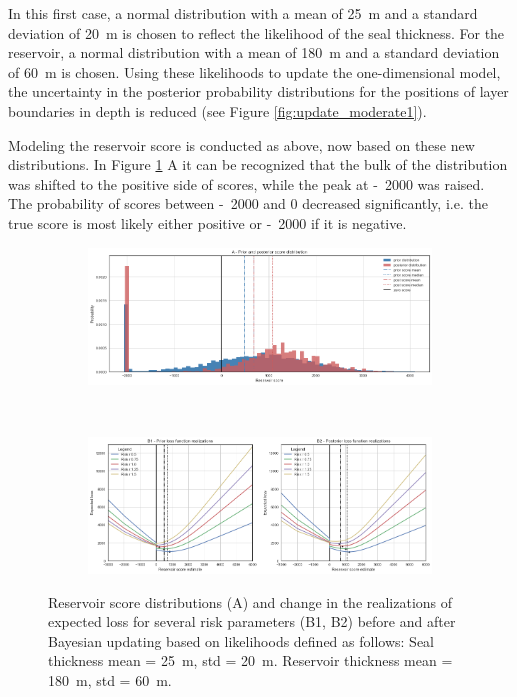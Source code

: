 				In this first case, a normal distribution with a mean of 25~m and a standard deviation of 20~m is chosen to reflect the likelihood of the seal thickness. For the reservoir, a normal distribution with a mean of 180~m and a standard deviation of 60~m is chosen. Using these likelihoods to update the one-dimensional model, the uncertainty in the posterior probability distributions for the positions of layer boundaries in depth is reduced (see Figure \ref{fig:update_moderate1}).
					
				Modeling the reservoir score is conducted as above, now based on these new distributions. In Figure \ref{fig:update_moderate2_3} A it can be recognized that the bulk of the distribution was shifted to the positive side of scores, while the peak at -~2000 was raised. The probability of scores between -~2000 and 0 decreased significantly, i.e. the true score is most likely either positive or -~2000 if it is negative.	
				
				\begin{figure}[h]
					\begin{subfigure}{1\textwidth}
						\centering
						\includegraphics[width=1\linewidth]{Figures/update_moderate2.png}
					\end{subfigure}%
					\\
					\begin{subfigure}{1\textwidth}
						\centering
						\includegraphics[width=1\linewidth]{Figures/update_moderate3.png}
					\end{subfigure}
					\caption{Reservoir score distributions (A) and change in the realizations of expected loss for several risk parameters (B1, B2) before and after Bayesian updating based on likelihoods defined as follows: Seal thickness mean = 25~m, std = 20~m. Reservoir thickness mean = 180~m, std = 60~m.}
					\label{fig:update_moderate2_3}
				\end{figure}
				
